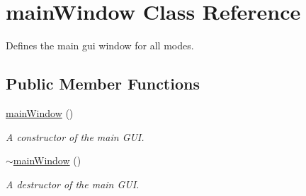 \hypertarget{classmain_window}{}\section{main\+Window Class Reference}
\label{classmain_window}


Defines the main gui window for all modes.  


\subsection*{Public Member Functions}
\begin{DoxyCompactItemize}
\item 
\mbox{\hyperlink{classmain_window_a467ea0d8090c122e5b5fd69f77ed3476}{main\+Window}} ()
\begin{DoxyCompactList}\small\item\em A constructor of the main G\+UI. \end{DoxyCompactList}\item 
\mbox{\hyperlink{classmain_window_a2c4caa71599521dbde5bc35b230ed648}{$\sim$main\+Window}} ()
\begin{DoxyCompactList}\small\item\em A destructor of the main G\+UI. \end{DoxyCompactList}\end{DoxyCompactItemize}
